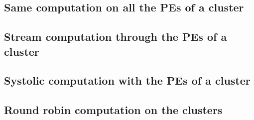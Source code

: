 \documentclass[a4paper]{article}
\begin{document}



\subsection{Same computation on all the PEs of a cluster}
\label{sec:same-computation-all-2}




\subsection{Stream computation through the PEs of a cluster}
\label{sec:stre-comp-thro}




\subsection{Systolic computation with the PEs of a cluster}
\label{sec:syst-comp-with}




\subsection{Round robin computation on the clusters}
\label{sec:round-robin-comp}




%
\end{document}
